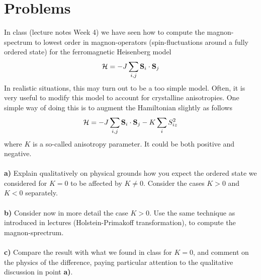 \section*{Problems}
\begin{problem}
	In class (lecture notes Week 4) we have seen how to compute the magnon-spectrum to lowest order in magnon-operators (spin-fluctuations around a fully ordered state) for the ferromagnetic Heisenberg model 
	\begin{eqnarray}
		\mathcal{H} = - J \sum_{i,j} {\bf S}_i \cdot {\bf S}_j \nonumber
	\end{eqnarray}
	In realistic situations, this may turn out to be a too simple model. Often, it is very useful to modify this model to account for crystalline anisotropies. One simple way of doing this is to augment the Hamiltonian slightly as follows 
	\begin{eqnarray}
		\mathcal{H} = - J \sum_{i,j} {\bf S}_i \cdot {\bf S}_j  - K \sum_i S_{iz}^2 \nonumber
	\end{eqnarray}
	where $K$ is a so-called anisotropy parameter. It could be both positive and negative. 
	\ \\
	\ \\
	{\bf a)} Explain qualitatively on physical grounds how you expect the ordered state we considered for $K=0$ to be affected by $K \neq 0$. Consider the cases $K > 0$ and $K < 0$ separately.
	\ \\
	\ \\
	{\bf b)} Consider now in more detail the case $K > 0$. Use the same technique as introduced in lectures (Holstein-Primakoff transformation), to compute the magnon-sprectrum.
	\ \\
	\ \\
	{\bf c)} Compare the result with what we found in class for $K=0$, and comment on the physics of the difference, paying particular attention to the qualitative discussion in point  {\bf a)}. 
\end{problem}


